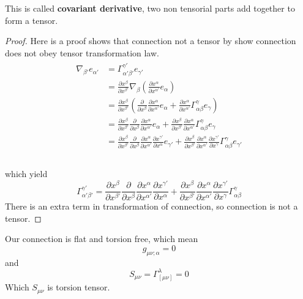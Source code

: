 \documentclass[12pt]{article}
\theoremstyle{mystyle}{\newtheorem{definition}{Definition}[section]}
\theoremstyle{mystyle}{\newtheorem{theorem}[definition]{Theorem}}
\theoremstyle{mystyle}{\newtheorem*{remark}{Remark}}
\theoremstyle{mystyle}{\newtheorem*{example}{Example}}
\theoremstyle{mystyle}{\newtheorem*{examples}{Examples}}
\theoremstyle{cstyle}{\newtheorem*{cthm}{}}
\begin{document}
This is called \textbf{covariant derivative}, two non tensorial parts add together to form a tensor.

\begin{proof}
  Here is a proof shows that connection not a tensor by show connection does not obey tensor transformation law.
  \begin{align*}
    \begin{split}
      \nabla_{\beta'}e_{\alpha'} & = \Gamma^{\gamma'}_{\alpha'\beta'}e_{\gamma'} \\
      &= \frac{\partial x^{\beta}}{\partial x^{\beta'}}\nabla_{\beta}(\frac{\partial x^{\alpha}}{\partial x^{\alpha'}}e_{\alpha})\\
      &= \frac{\partial x^{\beta}}{\partial x^{\beta'}}
      (\frac{\partial}{\partial x^{\beta}}\frac{\partial x^{\alpha}}{\partial x^{\alpha'}}e_{\alpha}
      + \frac{\partial x^{\alpha}}{\partial x^{\alpha'}} \Gamma ^{\gamma}_{\alpha\beta} e_{\gamma})\\
      &= \frac{\partial x^{\beta}}{\partial x^{\beta'}}
      \frac{\partial}{\partial x^{\beta}}\frac{\partial x^{\alpha}}{\partial x^{\alpha'}}e_{\alpha}
      + \frac{\partial x^{\beta}}{\partial x^{\beta'}}
      \frac{\partial x^{\alpha}}{\partial x^{\alpha'}} \Gamma ^{\gamma}_{\alpha\beta} e_{\gamma}\\
      &= \frac{\partial x^{\beta}}{\partial x^{\beta'}}
      \frac{\partial}{\partial x^{\beta}}\frac{\partial x^{\alpha}}{\partial x^{\alpha'}}\frac{\partial x^{\gamma'}}{\partial x^{\alpha}}e_{\gamma'}
      + \frac{\partial x^{\beta}}{\partial x^{\beta'}}
      \frac{\partial x^{\alpha}}{\partial x^{\alpha'}} \frac{\partial x^{\gamma'}}{\partial x^{\gamma}} \Gamma ^{\gamma}_{\alpha\beta}  e_{\gamma'}\\
    \end{split}
  \end{align*}
  \\
  which yield \[\Gamma^{\gamma'}_{\alpha'\beta'} = \frac{\partial x^{\beta}}{\partial x^{\beta'}}
    \frac{\partial}{\partial x^{\beta}}\frac{\partial x^{\alpha}}{\partial x^{\alpha'}}\frac{\partial x^{\gamma'}}{\partial x^{\alpha}}
    + \frac{\partial x^{\beta}}{\partial x^{\beta'}}
    \frac{\partial x^{\alpha}}{\partial x^{\alpha'}}
    \frac{\partial x^{\gamma'}}{\partial x^{\gamma}} \Gamma ^{\gamma}_{\alpha\beta}\]
  There is an extra term in transformation of connection, so connection is not a tensor.
\end{proof}
Our connection is flat and torsion free, which mean \[g_{\mu\nu;\alpha} = 0\] and\[S_{\mu\nu} = \Gamma_{[\mu\nu]}^{\lambda} = 0 \]
Which \(S_{\mu\nu}\) is torsion tensor.
\end{document}
